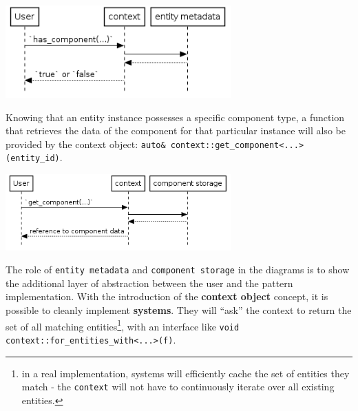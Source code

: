 \documentclass[twoside, 12pt, a4paper, openany]{book}
\let\origfigure=\figure
\let\endorigfigure=\endfigure
\renewenvironment{figure}[1][]{%
\origfigure[H]
}{%
\endorigfigure
}
\begin{document}
\begin{figure}[htbp]
\centering
\includegraphics[width=0.65000\textwidth]{source/figures/generated/ecs/overview/dod_composition/uml_context_has_component.png}
\caption{DOD: checking component type availability through context
object}
\end{figure}

Knowing that an entity instance possesses a specific component type, a
function that retrieves the data of the component for that particular
instance will also be provided by the context object:
\texttt{auto& context::get_component<...>(entity_id)}.

\begin{figure}[htbp]
\centering
\includegraphics[width=0.65000\textwidth]{source/figures/generated/ecs/overview/dod_composition/uml_context_get_component.png}
\caption{DOD: getting component instance data through context object}
\end{figure}

The role of
\texttt{entity metadata}
and
\texttt{component storage}
in the diagrams is to show the additional layer of abstraction between
the user and the pattern implementation. With the introduction of the
\textbf{context object} concept, it is possible to cleanly implement
\textbf{systems}. They will ``ask'' the context to return the set of all
matching entities\footnote{in a real implementation, systems will
  efficiently cache the set of entities they match - the
  \texttt{context}
  will not have to continuously iterate over all existing entities.},
with an interface like
\texttt{void context::for_entities_with<...>(f)}.
\end{document}
